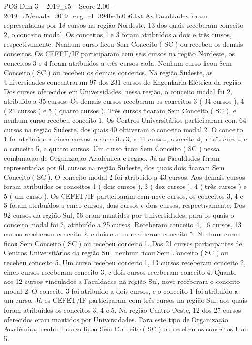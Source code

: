 \begin{textsample}{POS Dim 3 – 2019\_c5 – Score 2.00 – 2019\_c5/enade\_2019\_eng\_el\_394be1c0b6.txt}
As Faculdades foram representadas por 18 cursos na região Nordeste, 13 dos quais receberam conceito 2, o conceito modal.
Os conceitos 1 e 3 foram atribuídos a dois e três cursos, respectivamente.
Nenhum curso ficou Sem Conceito ( SC ) ou recebeu os demais conceitos.
Os CEFET/IF participaram com seis cursos na região Nordeste, os conceitos 3 e 4 foram atribuídos a três cursos cada.
Nenhum curso ficou Sem Conceito ( SC ) ou recebeu os demais conceitos.
Na região Sudeste, as Universidades concentraram 97 dos 231 cursos de Engenharia Elétrica da região.
Dos cursos oferecidos em Universidades, nessa região, o conceito modal foi 2, atribuído a 35 cursos.
Os demais cursos receberam os conceitos 3 ( 34 cursos ), 4 ( 21 cursos ) e 5 ( quatro cursos ).
Três cursos ficaram Sem Conceito ( SC ), e nenhum curso recebeu conceito 1.
Os Centros Universitários participaram com 64 cursos na região Sudeste, dos quais 40 obtiveram o conceito modal 2.
O conceito 1 foi atribuído a cinco cursos, o conceito 3, a 11 cursos, conceito 4, a três cursos e o conceito 5, a quatro cursos.
Um curso ficou Sem Conceito ( SC ) nessa combinação de Organização Acadêmica e região.
Já as Faculdades foram representadas por 61 cursos na região Sudeste, dos quais dois ficaram Sem Conceito ( SC ).
O conceito modal 2 foi atribuído a 43 cursos.
Aos demais cursos foram atribuídos os conceitos 1 ( dois cursos ), 3 ( dez cursos ), 4 ( três cursos ) e 5 ( um curso ).
Os CEFET/IF participaram com nove cursos, os conceitos 3, 4 e 5 foram atribuídos a cinco cursos, dois cursos e dois cursos, respectivamente.
Dos 92 cursos da região Sul, 56 eram mantidos por Universidades, para os quais o conceito modal foi 3, atribuído a 25 cursos.
Receberam conceito 4, 16 cursos, 13 cursos receberam conceito 2, e dois cursos receberam conceito 5.
Nenhum curso ficou Sem Conceito ( SC ) ou recebeu conceito 1.
Dos 21 cursos participantes de Centros Universitários da região Sul, nenhum ficou Sem Conceito ( SC ) ou recebeu conceito 5.
Um curso recebeu conceito 1, 13 cursos receberam conceito 2, cinco cursos receberam conceito 3, e dois cursos receberam conceito 4.
Quanto aos 12 cursos vinculados a Faculdades na região Sul, nove receberam o conceito modal 2.
O conceito 3 foi atribuído a dois cursos, e o conceito 1 foi atribuído a um curso.
Já os CEFET/IF participaram com três cursos na região Sul, aos quais foram atribuídos os conceitos 3, 4 e 5.
Na região Centro-Oeste, 12 dos 27 cursos oferecidos eram mantidos por Universidades.
Para este tipo de Organização Acadêmica, nenhum curso ficou Sem Conceito ( SC ) ou recebeu os conceitos 1 ou 5.

\end{textsample}
